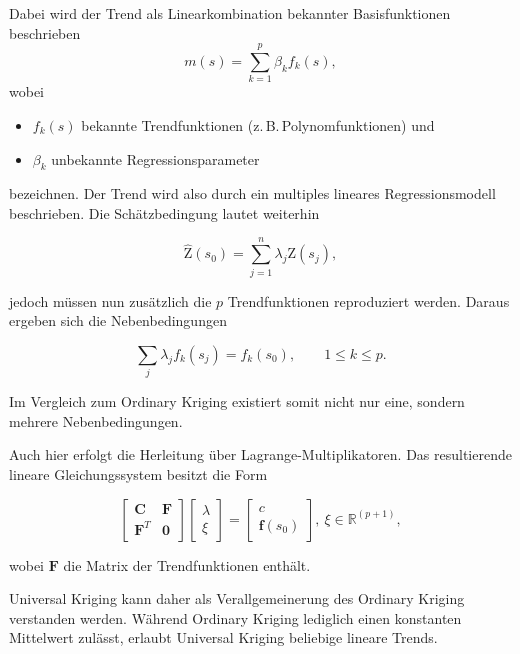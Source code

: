 Dabei wird der Trend als Linearkombination bekannter 
Basisfunktionen beschrieben
\begin{equation}
m(s) = \sum_{k=1}^{p} \beta_k f_k(s),
\end{equation}
wobei
\begin{itemize}[topsep=2pt,parsep=1pt,itemsep=0.5pt]
\item[$\circ$] $f_k(s)$ bekannte Trendfunktionen  (z.\,B.\,Polynomfunktionen) und
\item[$\circ$] $\beta_k$ unbekannte Regressionsparameter
\end{itemize}
bezeichnen. Der Trend wird also durch ein multiples lineares 
Regressionsmodell beschrieben. 
Die Schätzbedingung lautet weiterhin

\begin{equation}
\label{Gl_Schätzbedinung_UniversalKriging}
\hat{\mathrm{Z}}(s_0) = \sum_{j=1}^n \lambda_j \mathrm{Z}(s_j),
\end{equation}

jedoch müssen nun zusätzlich die $p$ Trendfunktionen reproduziert 
werden. Daraus ergeben sich die Nebenbedingungen

\begin{equation}
\sum_j \lambda_j f_k(s_j) =
f_k(s_0), \qquad 1 \leq k \leq p.
\end{equation}

Im Vergleich zum Ordinary Kriging existiert somit nicht 
nur eine, sondern mehrere Nebenbedingungen.

Auch hier erfolgt die Herleitung über Lagrange-Multiplikatoren. Das resultierende 
lineare Gleichungssystem besitzt die Form

\begin{equation}
\begin{bmatrix}
\mathbf{C} & \mathbf{F}\\
\mathbf{F}^T & \mathbf{0}
\end{bmatrix}
\begin{bmatrix}
\lambda\\
\xi
\end{bmatrix}
=
\begin{bmatrix}
c\\
\mathbf{f}(s_0)
\end{bmatrix},\ \xi \in \mathbb{R}^{(p+1)},
\end{equation}

wobei $\mathbf{F}$ die Matrix der Trendfunktionen enthält.

Universal Kriging kann daher als Verallgemeinerung des Ordinary Kriging 
verstanden werden. Während Ordinary Kriging lediglich einen konstanten 
Mittelwert zulässt, erlaubt Universal Kriging beliebige lineare Trends.


